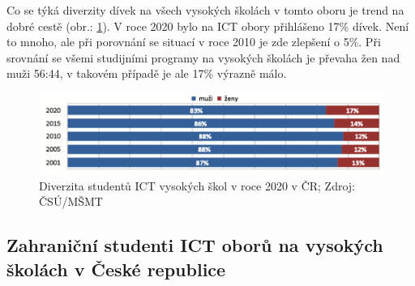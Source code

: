 \documentclass[12pt]{report}			%
\begin{document}
                Co se týká diverzity dívek na všech vysokých školách v tomto oboru je trend na dobré cestě (obr.: \ref{fig:pohlavi_VS}). V roce 2020 bylo na ICT obory přihlášeno 17\% dívek. Není to mnoho, ale při porovnání se situací v roce 2010 je zde zlepšení o 5\%. Při srovnání se všemi studijními programy na vysokých školách je převaha žen nad muži 56:44, v takovém případě je ale 17\% výrazně málo.\cite{LidskeZdrojeVIT}
                
                \begin{figure}[h]
                    \centering
                     \includegraphics[width=16cm]{Maturitni Prace/images/pohlavi_VS.png}
                    \caption[Diverzita studentů ICT vysokých škol v roce 2020 v ČR]{Diverzita studentů ICT vysokých škol v roce 2020 v ČR; Zdroj: ČSÚ/MŠMT}
                    \label{fig:pohlavi_VS}
                \end{figure}
  
            \subsection{Zahraniční studenti ICT oborů na vysokých školách v České republice}
            
\end{document}
